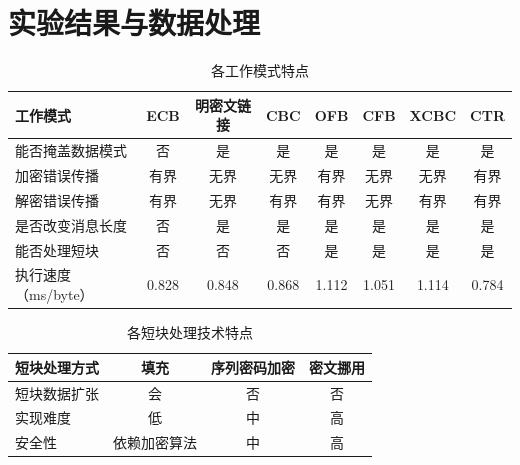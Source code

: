 \documentclass[a4paper,11pt,UTF8]{ctexart}
\begin{document}
\section{实验结果与数据处理}

    \begin{table}[h!]
        \begin{center}
        \caption{各工作模式特点}
        \begin{tabular}{l|c|c|c|c|c|c|c} %
            \textbf{工作模式} & \textbf{ECB} & \textbf{明密文链接} & \textbf{CBC} & \textbf{OFB} & \textbf{CFB} & \textbf{XCBC} & \textbf{CTR} \\
            \hline
            能否掩盖数据模式    & 否    & 是    & 是    & 是    & 是    & 是    & 是 \\
            加密错误传播       & 有界   & 无界  & 无界  & 有界   & 无界  & 无界  & 有界 \\
            解密错误传播       &有界    & 无界  & 有界  & 有界   & 无界  & 有界  & 有界 \\
            是否改变消息长度   & 否     & 是    & 是    & 是    & 是    & 是    & 是 \\
            能否处理短块       & 否    & 否    &否      & 是    & 是    & 是    & 是 \\
            执行速度（ms/byte） & 0.828 & 0.848 & 0.868 & 1.112 & 1.051 & 1.114 & 0.784 \\
        \end{tabular}
        \end{center}
    \end{table}

    \begin{table}[h!]
        \begin{center}
          \caption{各短块处理技术特点}
          \begin{tabular}{l|c|c|c} %
            \textbf{短块处理方式} & \textbf{填充} & \textbf{序列密码加密} & \textbf{密文挪用} \\
            \hline
            短块数据扩张 & 会 & 否 & 否 \\
            实现难度     & 低 & 中 & 高 \\
            安全性      & 依赖加密算法 & 中 & 高 \\
          \end{tabular}
        \end{center}
    \end{table}
      
\end{document}
